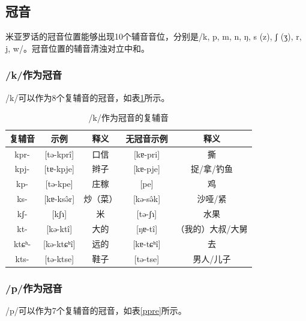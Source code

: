 \subsection{冠音}

米亚罗话的冠音位置能够出现10个辅音音位，分别是/k, p, m, n, ŋ, s (z), ʃ (ʒ), r, j, w/。冠音位置的辅音清浊对立中和。

\subsubsection{/k/作为冠音}

/k/可以作为8个复辅音的冠音，如表\ref{kpre}所示。

\begin{table}[H]
\vspace{5pt}
    \centering
    \caption{/k/作为冠音的复辅音}
    \label{kpre}
\begin{tabular}{c|cccc}
     \toprule
复辅音   & 示例              & 释义   & 无冠音示例          & 释义        \\
     \midrule
	kpr-  & {[}tə-kprî{]}  & 口信   & {[}kɐ-pri{]}   & 撕         \\
kpj-  & {[}tɐ-kpje{]}   & 辫子   & {[}kɐ-pje{]}   & 捉/拿/钓鱼    \\
kp-   & {[}tə-kpe{]}    & 庄稼   & {[}pe{]}       & 鸡         \\
ks-   & {[}kɐ-ksə̂r{]}  & 炒（菜） & {[}kə-sə̂k{]}  & 沙哑/紧      \\
kʃ-   & {[}kʃɿ{]}       & 米    & {[}tə-ʃɿ{]}    & 水果        \\
kt-   & {[}kə-ktî{]}   & 大的   & {[}ŋɐ-tî{]}   & （我的）大叔/大舅 \\
ktɕʰ- & {[}kə-ktɕʰî{]} & 远的   & {[}kɐ-tɕʰî{]} & 去         \\
kts-  & {[}tə-ktse{]}   & 鞋子   & {[}tə-tse{]}   & 男人/儿子    \\ 
   \bottomrule
\end{tabular}
\end{table}

\subsubsection{/p/作为冠音}

/p/可以作为7个复辅音的冠音，如表\ref{ppre}所示。

